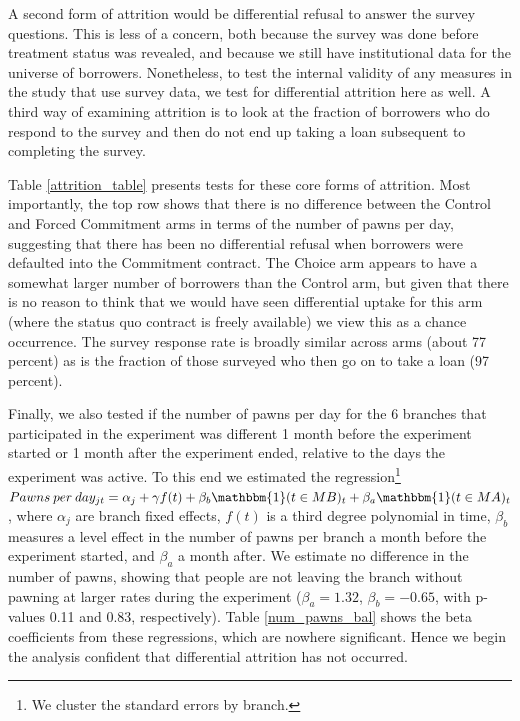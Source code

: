 \documentclass[oneside,11pt]{article}
\begin{document}
A second form of attrition would be differential refusal to answer the survey questions.  This is less of a concern, both because the survey was done before treatment status was revealed, and because we still have institutional data for the universe of borrowers.  Nonetheless, to test the internal validity of any measures in the study that use survey data, we test for differential attrition here as well.  A third way of examining attrition is to look at the fraction of borrowers who do respond to the survey and then do not end up taking a loan subsequent to completing the survey.






Table \ref{attrition_table} presents tests for these core forms of attrition.  Most importantly, the top row shows that there is no difference between the Control and Forced Commitment arms in terms of the number of pawns per day, suggesting that there has been no differential refusal when borrowers were defaulted into the Commitment contract.  The Choice arm appears to have a somewhat larger number of borrowers than the Control arm, but given that there is no reason to think that we would have seen differential uptake for this arm (where the status quo contract is freely available) we view this as a chance occurrence.  The survey response rate is broadly similar across arms (about 77 percent) as is the fraction of those surveyed who then go on to take a loan (97 percent).  



Finally, we also tested if the number of pawns per day for the 6 branches that participated in the experiment was different 1 month before the experiment started or 1 month after the experiment ended, relative to the days the experiment was active. To this end we estimated the regression\footnote{We cluster the standard errors by branch.} $Pawns \: per \: day_{jt} = \alpha_j + \gamma f(t) + \beta_b \mathbbm{1}(t \in MB)_{t} +\beta_a \mathbbm{1}(t \in MA)_{t}$, where $\alpha_j$ are branch fixed effects, $f(t)$ is a third degree polynomial in time, $\beta_b$ measures a level effect in the number of pawns per branch a month before the experiment started, and $\beta_a$ a month after. We estimate no difference in the number of pawns, showing that people are not leaving the branch without pawning at larger rates during the experiment ($\beta_a=1.32$, $\beta_b=-0.65$, with p-values 0.11 and 0.83, respectively).  Table \ref{num_pawns_bal} shows the beta coefficients from these regressions, which are nowhere significant.  Hence we begin the analysis confident that differential attrition has not occurred.  
\end{document}
